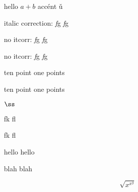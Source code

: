 \documentclass[11pt]{scrartcl}
\begin{document}
hello $a+b$ acc\'ent \v u

italic correction: \textit{f}g {\itshape f}g

\def\nocorrlist{g}
no itcorr: \textit{f}g {\itshape f}g

\def\nocorrlist{}
no itcorr: \textit{f\nocorr}g {\itshape f}g

{\fontsize{10.1pt}{10.1pt}\selectfont ten point one points}

{\fontsize{10.1pt}{10.1pt}\selectfont ten point one points}


$\ss$ %

fk fl

\selectfont

fk fl

hello \selectfont hello

blah \fontsize{18.7}{0}\selectfont blah

\[
\sqrt{x^{x^y}}
\]
\end{document}
